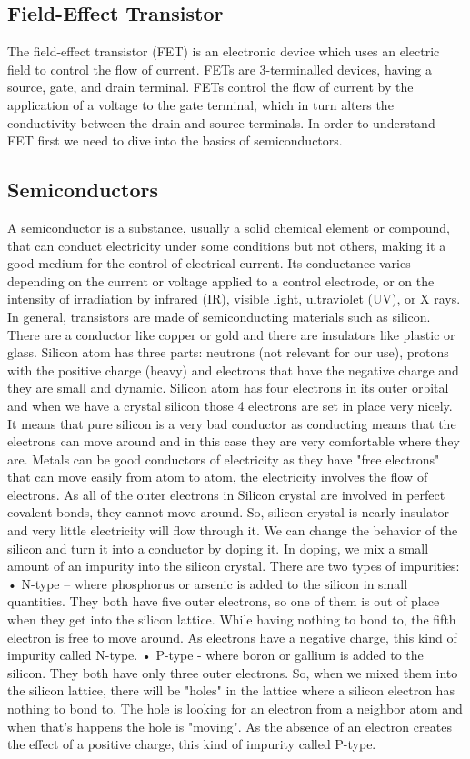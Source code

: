 \subsection{ Field-Effect Transistor }
The field-effect transistor (FET) is an electronic device which uses an electric field to control the flow of current. FETs are 3-terminalled devices, having a source, gate, and drain terminal. FETs control the flow of current by the application of a voltage to the gate terminal, which in turn alters the conductivity between the drain and source terminals.
In order to understand FET first we need to dive into the basics of semiconductors.
\subsection{ Semiconductors }
A semiconductor is a substance, usually a solid chemical element or compound, that can conduct electricity under some conditions but not others, making it a good medium for the control of electrical current. Its conductance varies depending on the current or voltage applied to a control electrode, or on the intensity of irradiation by infrared (IR), visible light, ultraviolet (UV), or X rays.
In general, transistors are made of semiconducting materials such as silicon. There are a conductor like copper or gold and there are insulators like plastic or glass. 
Silicon atom has three parts: neutrons (not relevant for our use), protons with the positive charge (heavy) and electrons that have the negative charge and they are small and dynamic. Silicon atom has four electrons in its outer orbital and when we have a crystal silicon those 4 electrons are set in place very nicely. It means that pure silicon is a very bad conductor as  conducting means that the electrons can move around and in this case they are very comfortable where they are.
Metals can be good conductors of electricity as they have "free electrons" that can move easily from atom to atom, the electricity involves the flow of electrons. As all of the outer electrons in Silicon crystal are involved in perfect covalent bonds, they cannot move around. So, silicon crystal is nearly insulator and very little electricity will flow through it.
We can change the behavior of  the silicon and turn it into a conductor by doping it. In doping, we mix a small amount of an impurity into the silicon crystal.
There are two types of impurities:
•	N-type – where phosphorus or arsenic is added to the silicon in small quantities. They both have  five outer electrons, so one of them is out of place when they get into the silicon lattice. While having nothing to bond to, the fifth electron is free to move around. As electrons have a negative charge, this kind of impurity called N-type.
•	P-type - where boron or gallium is added to the silicon. They both have only three outer electrons. So, when we mixed them into the silicon lattice, there will be "holes" in the lattice where a silicon electron has nothing to bond to. The hole is looking for an electron from a neighbor atom and when that’s happens the hole is "moving". As the absence of an electron creates the effect of a positive charge, this kind of impurity called P-type.
